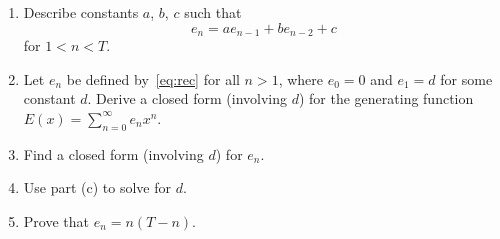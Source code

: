 \documentclass[article,12pt,a4paper]{article}
\newcounter{num}  %
\begin{document}
			\begin{enumerate}
				\item Describe constants $a$, $b$, $c$ such that
				\begin{equation}\label{eq:rec}
					e_n = a e_{n-1} + b e_{n-2} + c 
				\end{equation}
				for $1 < n < T$.
				 \vspace{7cm}
				\item Let $e_n$ be defined by~\eqref{eq:rec} for all $n > 1$, where $e_0 = 0$ and $e_1 = d$ for some constant $d$. Derive a closed form (involving $d$) for the generating function $E(x) = \sum_{n=0}^{\infty} e_n x^n$.
				
				\item Find a closed form (involving $d$) for $e_n$.
				
				\vspace{5cm}
				
				\item Use part (c) to solve for $d$.
				
				\vspace{5cm}
				\item Prove that $e_n = n(T - n)$.
				
				\vspace{5cm}
			\end{enumerate}
			
		
		
		
		
	
	
\end{document}
